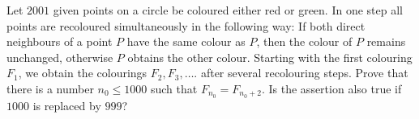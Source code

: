 Let $2001$ given points on a circle be coloured either red or green. In one step all points are recoloured simultaneously in the following way: If both direct neighbours of a point $P$ have the same colour as $P$,  then the colour of $P$ remains unchanged, otherwise $P$ obtains the other colour. Starting with the first colouring $F_1$,  we obtain the colourings $F_2,F_3 ,\ldots .$ after several recolouring steps. Prove that there is a number $n_0\le 1000$ such that $F_{n_0}=F_{n_0 +2}$. Is the assertion also true if $1000$ is replaced by $999$?